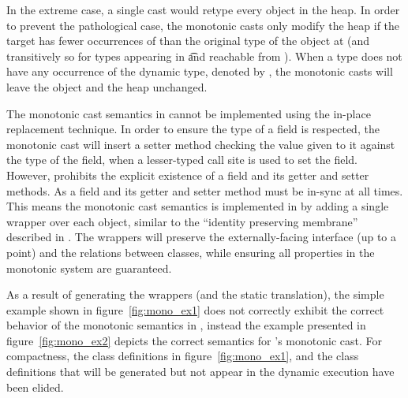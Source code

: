 \documentclass[a4paper,USenglish]{tex/lipics-v2016}
\begin{document}
In the extreme case, a single cast would retype every object in the heap.
In order to prevent the pathological case, the monotonic casts only modify
the heap if the target \C has fewer occurrences of \any than the original
type of the object at \a (and transitively so for types appearing in \t and
reachable from \a).  When a type \C does not have any occurrence of the
dynamic type, denoted by \statictype\C\K\V, the monotonic casts will leave
the object and the heap unchanged.

The monotonic cast semantics in \kafka cannot be implemented using the
in-place replacement technique\cite{Siek2015}. In order to ensure the type
of a field is respected, the monotonic cast will insert a setter method
checking the value given to it against the type of the field, when a
lesser-typed call site is used to set the field. However, \kafka prohibits
the explicit existence of a field and its getter and setter methods.  As a
field and its getter and setter method must be in-sync at all times.  This
means the monotonic cast semantics is implemented in \kafka by adding a
single wrapper over each object, similar to the ``identity preserving
membrane'' described in \cite{keil_et_al:DARTS:2015:5511}. The wrappers will
preserve the externally-facing interface (up to a point) and the relations
between classes, while ensuring all properties in the monotonic system are
guaranteed.

As a result of generating the wrappers (and the static translation), the
simple example shown in figure~\ref{fig:mono_ex1} does not correctly exhibit
the correct behavior of the monotonic semantics in \kafka, instead the
example presented in figure~\ref{fig:mono_ex2} depicts the correct semantics
for \kafka's monotonic cast.  For compactness, the class definitions in
figure~\ref{fig:mono_ex1}, and the class definitions that will be generated
but not appear in the dynamic execution have been elided.
\end{document}
